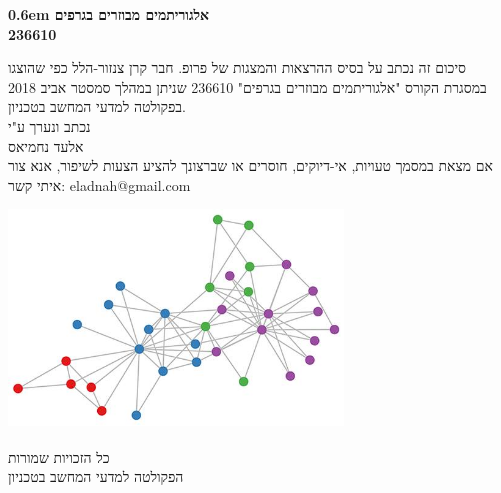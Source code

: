 \clearpage
\newcommand\nbvspace[1][3]{\vspace*{\stretch{#1}}}
\newcommand\nbstretchyspace{\spaceskip0.5em plus 0.25em minus 0.25em}
\newcommand{\nbtitlestretch}{\spaceskip0.6em}
\pagestyle{empty}
\begin{center}
\bfseries
\nbvspace[1]
\Huge
{\nbtitlestretch\huge
אלגוריתמים מבוזרים בגרפים\\
236610}

\nbvspace[1]
\normalsize

סיכום זה נכתב על בסיס ההרצאות והמצגות של פרופ. חבר קרן צנזור-הלל כפי שהוצגו במסגרת הקורס "אלגוריתמים מבוזרים בגרפים" 236610 שניתן במהלך סמסטר אביב 2018 בפקולטה למדעי המחשב בטכניון.\\
\nbvspace[1]
\small נכתב ונערך ע"י\\
\normalsize אלעד נחמיאס\\[1.5em]
\footnotesize אם מצאת במסמך טעויות, אי-דיוקים, חוסרים או שברצונך להציע הצעות לשיפור, אנא צור איתי קשר: eladnah@gmail.com

\nbvspace[2]

\includegraphics[width=3.5in]{./graphics/cover.jpg}
\nbvspace[3]
\normalsize

\textsuperscript{\faCopyright} כל הזכויות שמורות\\
\large
הפקולטה למדעי המחשב בטכניון
\nbvspace[1]
\end{center}
\pagebreak
